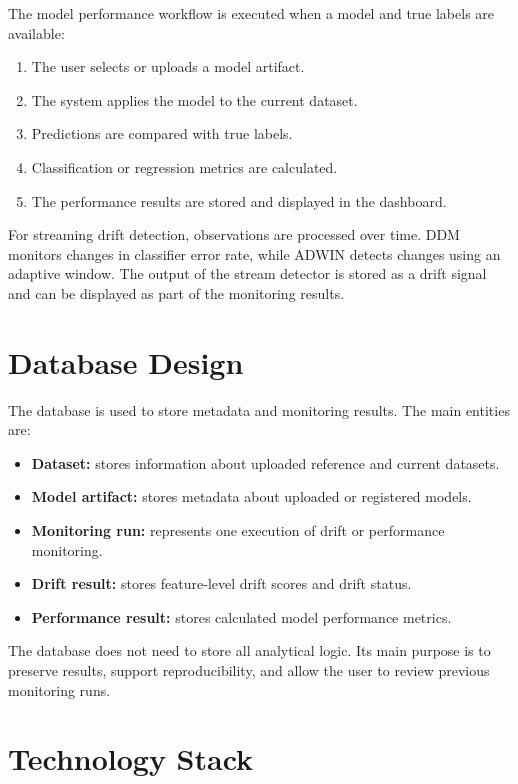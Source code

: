 The model performance workflow is executed when a model and true labels are available:

\begin{enumerate}
    \item The user selects or uploads a model artifact.
    \item The system applies the model to the current dataset.
    \item Predictions are compared with true labels.
    \item Classification or regression metrics are calculated.
    \item The performance results are stored and displayed in the dashboard.
\end{enumerate}

For streaming drift detection, observations are processed over time. DDM monitors changes in classifier error rate, while ADWIN detects changes using an adaptive window. The output of the stream detector is stored as a drift signal and can be displayed as part of the monitoring results.

\section{Database Design}

The database is used to store metadata and monitoring results. The main entities are:

\begin{itemize}
    \item \textbf{Dataset:} stores information about uploaded reference and current datasets.
    \item \textbf{Model artifact:} stores metadata about uploaded or registered models.
    \item \textbf{Monitoring run:} represents one execution of drift or performance monitoring.
    \item \textbf{Drift result:} stores feature-level drift scores and drift status.
    \item \textbf{Performance result:} stores calculated model performance metrics.
\end{itemize}

The database does not need to store all analytical logic. Its main purpose is to preserve results, support reproducibility, and allow the user to review previous monitoring runs.

\section{Technology Stack}

